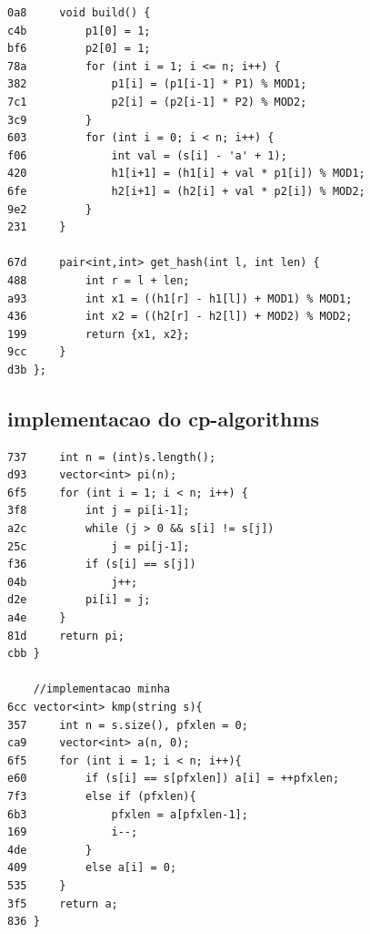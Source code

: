 \documentclass[11pt, a4paper, twoside]{article}
\begin{document}
\begin{lstlisting}
0a8     void build() {
c4b         p1[0] = 1;
bf6         p2[0] = 1;
78a         for (int i = 1; i <= n; i++) {
382             p1[i] = (p1[i-1] * P1) % MOD1;
7c1             p2[i] = (p2[i-1] * P2) % MOD2;
3c9         }
603         for (int i = 0; i < n; i++) {
f06             int val = (s[i] - 'a' + 1);
420             h1[i+1] = (h1[i] + val * p1[i]) % MOD1;
6fe             h2[i+1] = (h2[i] + val * p2[i]) % MOD2;
9e2         }
231     }
    
67d     pair<int,int> get_hash(int l, int len) {
488         int r = l + len;
a93         int x1 = ((h1[r] - h1[l]) + MOD1) % MOD1;
436         int x2 = ((h2[r] - h2[l]) + MOD2) % MOD2;
199         return {x1, x2};
9cc     }
d3b };
\end{lstlisting}

\subsection{implementacao do cp-algorithms}
\begin{lstlisting}
737     int n = (int)s.length();
d93     vector<int> pi(n);
6f5     for (int i = 1; i < n; i++) {
3f8         int j = pi[i-1];
a2c         while (j > 0 && s[i] != s[j])
25c             j = pi[j-1];
f36         if (s[i] == s[j])
04b             j++;
d2e         pi[i] = j;
a4e     }
81d     return pi;
cbb }
    
    //implementacao minha
6cc vector<int> kmp(string s){
357     int n = s.size(), pfxlen = 0;
ca9     vector<int> a(n, 0);
6f5     for (int i = 1; i < n; i++){
e60         if (s[i] == s[pfxlen]) a[i] = ++pfxlen;
7f3         else if (pfxlen){
6b3             pfxlen = a[pfxlen-1];
169             i--;
4de         }
409         else a[i] = 0;
535     }
3f5     return a;
836 }
\end{lstlisting}
\end{document}
